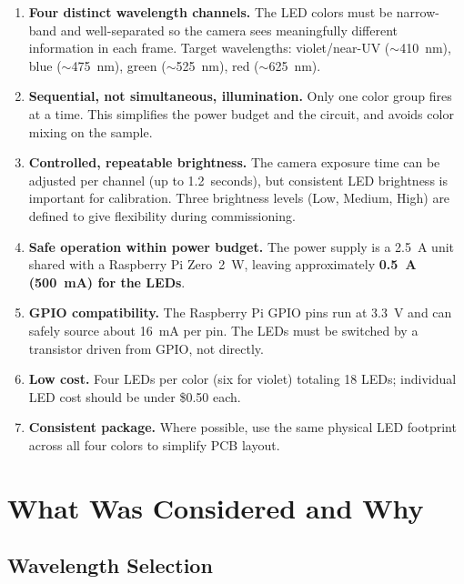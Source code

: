 \documentclass[12pt,letterpaper]{article}
\begin{document}
\begin{enumerate}[leftmargin=2em]
  \item \textbf{Four distinct wavelength channels.} The LED colors must be narrow-band and
    well-separated so the camera sees meaningfully different information in each frame.
    Target wavelengths: violet/near-UV ($\sim$410~nm), blue ($\sim$475~nm),
    green ($\sim$525~nm), red ($\sim$625~nm).

  \item \textbf{Sequential, not simultaneous, illumination.} Only one color group fires at
    a time. This simplifies the power budget and the circuit, and avoids color mixing on
    the sample.

  \item \textbf{Controlled, repeatable brightness.} The camera exposure time can be adjusted
    per channel (up to 1.2~seconds), but consistent LED brightness is important for
    calibration. Three brightness levels (Low, Medium, High) are defined to give flexibility
    during commissioning.

  \item \textbf{Safe operation within power budget.} The power supply is a 2.5~A unit shared
    with a Raspberry Pi Zero~2~W, leaving approximately \textbf{0.5~A (500~mA) for the LEDs}.

  \item \textbf{GPIO compatibility.} The Raspberry Pi GPIO pins run at 3.3~V and can safely
    source about 16~mA per pin. The LEDs must be switched by a transistor driven from GPIO,
    not directly.

  \item \textbf{Low cost.} Four LEDs per color (six for violet) totaling 18 LEDs; individual
    LED cost should be under \$0.50 each.

  \item \textbf{Consistent package.} Where possible, use the same physical LED footprint
    across all four colors to simplify PCB layout.
\end{enumerate}

\section{What Was Considered and Why}

\subsection{Wavelength Selection}
\end{document}
